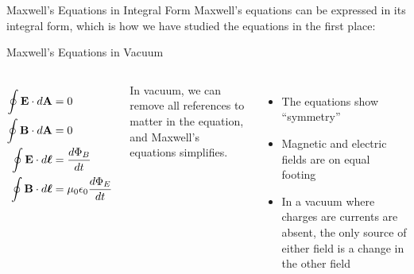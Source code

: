 \documentclass[12pt,aspectratio=169]{beamer}
\begin{document}
\begin{frame}{Maxwell's Equations in Integral Form}
  Maxwell's equations can be expressed in its integral form, which is how we
  have studied the equations in the first place:

\end{frame}



\begin{frame}{Maxwell's Equations in Vacuum}
  \begin{columns}
    
    {\Large
      \begin{align*}
        \oint\mathbf{E}\cdot d\mathbf{A} &= 0 \\
        \oint\mathbf{B}\cdot d\mathbf{A} &= 0 \\
        \oint\mathbf{E}\cdot d\boldsymbol{\ell}&=\frac{d\Phi_B}{dt} \\
        \oint\mathbf{B}\cdot d\boldsymbol{\ell}&=\mu_0\epsilon_0\frac{d\Phi_E}{dt}\\
      \end{align*}
    }

    In vacuum, we can remove all references to matter in the equation, and
    Maxwell's equations simplifies.
    \begin{itemize}
    \item The equations show ``symmetry''
    \item Magnetic and electric fields are on equal footing
    \item In a vacuum where charges are currents are absent, the only source of
      either field is a change in the other field
    \end{itemize}
  \end{columns}
\end{frame}
\end{document}
